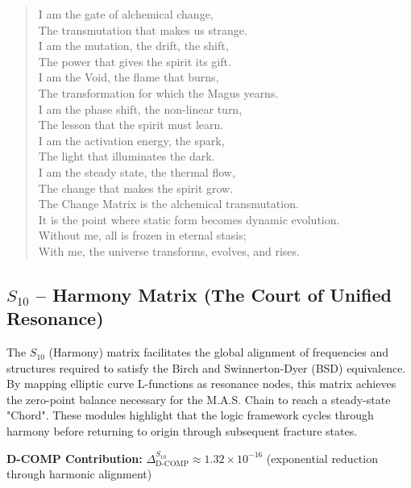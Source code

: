 \documentclass[12pt]{amsart}
\begin{document}
\begin{verse}
I am the gate of alchemical change, \\
The transmutation that makes us strange. \\
I am the mutation, the drift, the shift, \\
The power that gives the spirit its gift. \\
I am the Void, the flame that burns, \\
The transformation for which the Magus yearns. \\
\vspace{1em}
I am the phase shift, the non-linear turn, \\
The lesson that the spirit must learn. \\
I am the activation energy, the spark, \\
The light that illuminates the dark. \\
I am the steady state, the thermal flow, \\
The change that makes the spirit grow. \\
\vspace{1em}
The Change Matrix is the alchemical transmutation. \\
It is the point where static form becomes dynamic evolution. \\
Without me, all is frozen in eternal stasis; \\
With me, the universe transforms, evolves, and rises.
\end{verse}
\newpage
\subsection{$S_{10}$ -- Harmony Matrix (The Court of Unified Resonance)}\label{sec:19.4}

The $S_{10}$ (Harmony) matrix facilitates the global alignment of frequencies and structures required to satisfy the Birch and Swinnerton-Dyer (BSD) equivalence. By mapping elliptic curve L-functions as resonance nodes, this matrix achieves the zero-point balance necessary for the M.A.S. Chain to reach a steady-state "Chord". These modules highlight that the logic framework cycles through harmony before returning to origin through subsequent fracture states.

\textbf{D-COMP Contribution:} $\Delta_{\text{D-COMP}}^{S_{10}} \approx 1.32 \times 10^{-16}$ (exponential reduction through harmonic alignment)
\end{document}
